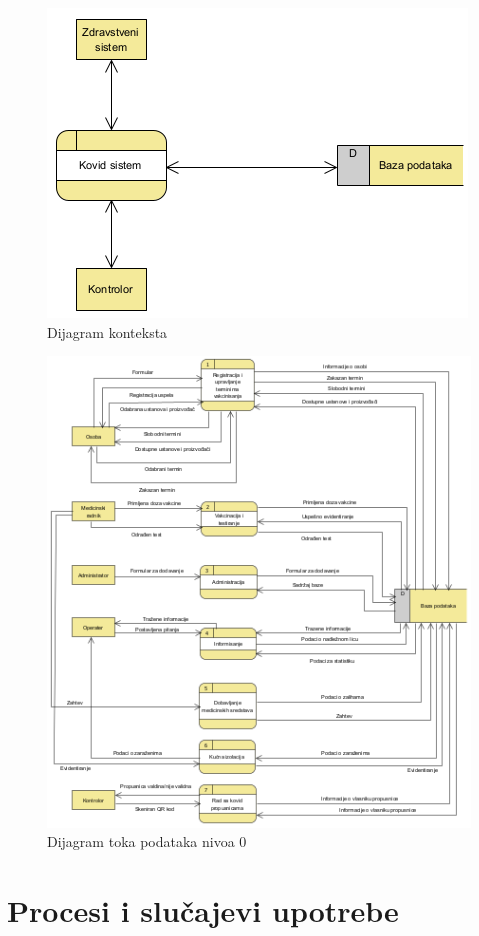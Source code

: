 \documentclass[titlepage]{article}
\begin{document}
\begin{figure}[H]
\centering
\includegraphics[scale=0.5]{Dijagram_konteksta}
\caption{Dijagram konteksta}
\label{slk:kontekst}
\end{figure}

\begin{figure}[H]
\centering
\includegraphics[scale=0.45]{DTP_dijagram}
\caption{Dijagram toka podataka nivoa 0}
\label{slk:dtp}
\end{figure}


\section{Procesi i slučajevi upotrebe}
\end{document}
